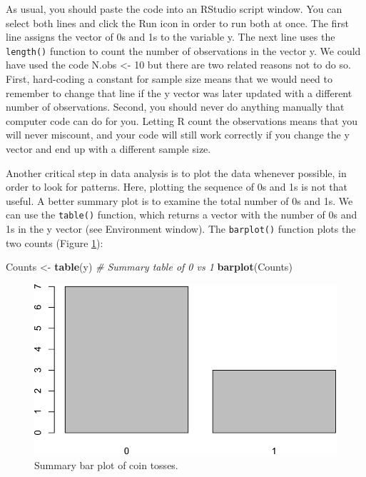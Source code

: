 \documentclass[
]{krantz}
\makeatletter
\newenvironment{Shaded}{\begin{snugshade}}{\end{snugshade}}
\newcommand{\CommentTok}[1]{\textcolor[rgb]{0.37,0.37,0.37}{\textit{#1}}}
\newcommand{\FunctionTok}[1]{\textcolor[rgb]{0.27,0.27,0.27}{\textbf{#1}}}
\newcommand{\NormalTok}[1]{#1}
\newcommand{\OtherTok}[1]{\textcolor[rgb]{0.37,0.37,0.37}{#1}}
\newenvironment{kframe}{%
\medskip{}
\setlength{\fboxsep}{.8em}
 \def\at@end@of@kframe{}%
 \ifinner\ifhmode%
  \def\at@end@of@kframe{\end{minipage}}%
  \begin{minipage}{\columnwidth}%
 \fi\fi%
 \def\FrameCommand##1{\hskip\@totalleftmargin \hskip-\fboxsep
 \colorbox{shadecolor}{##1}\hskip-\fboxsep
     \hskip-\linewidth \hskip-\@totalleftmargin \hskip\columnwidth}%
 \MakeFramed {\advance\hsize-\width
   \@totalleftmargin\z@ \linewidth\hsize
   \@setminipage}}%
 {\par\unskip\endMakeFramed%
 \at@end@of@kframe}
\renewenvironment{Shaded}{\begin{kframe}}{\end{kframe}}
\makeatother
\begin{document}
As usual, you should paste the code into an RStudio script window. You can select both lines and click the Run icon in order to run both at once. The first line assigns the vector of 0s and 1s to the variable y. The next line uses the \texttt{length()} function to count the number of observations in the vector y. We could have used the code N.obs \textless- 10 but there are two related reasons not to do so. First, hard-coding a constant for sample size means that we would need to remember to change that line if the y vector was later updated with a different number of observations. Second, you should never do anything manually that computer code can do for you. Letting R count the observations means that you will never miscount, and your code will still work correctly if you change the y vector and end up with a different sample size.

Another critical step in data analysis is to plot the data whenever possible, in order to look for patterns. Here, plotting the sequence of 0s and 1s is not that useful. A better summary plot is to examine the total number of 0s and 1s. We can use the \texttt{table()} function, which returns a vector with the number of 0s and 1s in the y vector (see Environment window). The \texttt{barplot()} function plots the two counts (Figure \ref{fig:coinToss}):

\begin{Shaded}
\begin{Highlighting}[]
\NormalTok{Counts }\OtherTok{\textless{}{-}} \FunctionTok{table}\NormalTok{(y)  }\CommentTok{\# Summary table of 0 vs 1}
\FunctionTok{barplot}\NormalTok{(Counts)}
\end{Highlighting}
\end{Shaded}

\begin{figure}
\includegraphics[width=0.9\linewidth]{bookdown_files/figure-latex/coinToss-1} \caption{Summary bar plot of coin tosses.}\label{fig:coinToss}
\end{figure}
\end{document}
